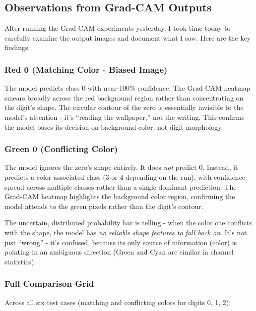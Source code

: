 \documentclass[9pt,a4paper,twocolumn,twoside]{tau-class/tau}
\begin{document}
    \subsection{Observations from Grad-CAM Outputs}

        After running the Grad-CAM experiments yesterday, I took time today to carefully examine the output images and document what I saw. Here are the key findings:

        \subsubsection{Red 0 (Matching Color - Biased Image)}

        The model predicts class 0 with near-100\% confidence. The Grad-CAM heatmap smears broadly across the red background region rather than concentrating on the digit's shape. The circular contour of the zero is essentially invisible to the model's attention - it's ``reading the wallpaper,'' not the writing. This confirms the model bases its decision on background color, not digit morphology.

        \subsubsection{Green 0 (Conflicting Color)}

        The model ignores the zero's shape entirely. It does \textit{not} predict 0. Instead, it predicts a color-associated class (3 or 4 depending on the run), with confidence spread across multiple classes rather than a single dominant prediction. The Grad-CAM heatmap highlights the background color region, confirming the model attends to the green pixels rather than the digit's contour.

        The uncertain, distributed probability bar is telling - when the color cue conflicts with the shape, the model has \textit{no reliable shape features to fall back on}. It's not just ``wrong'' - it's confused, because its only source of information (color) is pointing in an ambiguous direction (Green and Cyan are similar in channel statistics).

        \subsubsection{Full Comparison Grid}

        Across all six test cases (matching and conflicting colors for digits 0, 1, 2):
\end{document}
